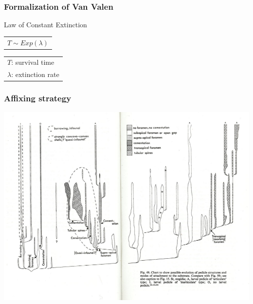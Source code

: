 \documentclass{beamer}
\begin{document}
\begin{frame}
  \frametitle{Formalization of Van Valen}

  \begin{block}{Law of Constant Extinction}
    \begin{center}
      \begin{tabular}{@{}l@{}}\(T \sim Exp(\lambda)\)\end{tabular}
      \hspace{1.5cm}
      \begin{tabular}{@{}l@{}}\(T\): survival time\\\(\lambda\): extinction rate\end{tabular}
    \end{center}
  \end{block}
\end{frame}

\begin{frame}
  \frametitle{Affixing strategy}
  \begin{center}
    \includegraphics[height = 0.8\textheight, width = \textwidth, keepaspectratio = true]{figure/rudwick}

    \tiny{}
  \end{center}

\end{frame}
\end{document}
